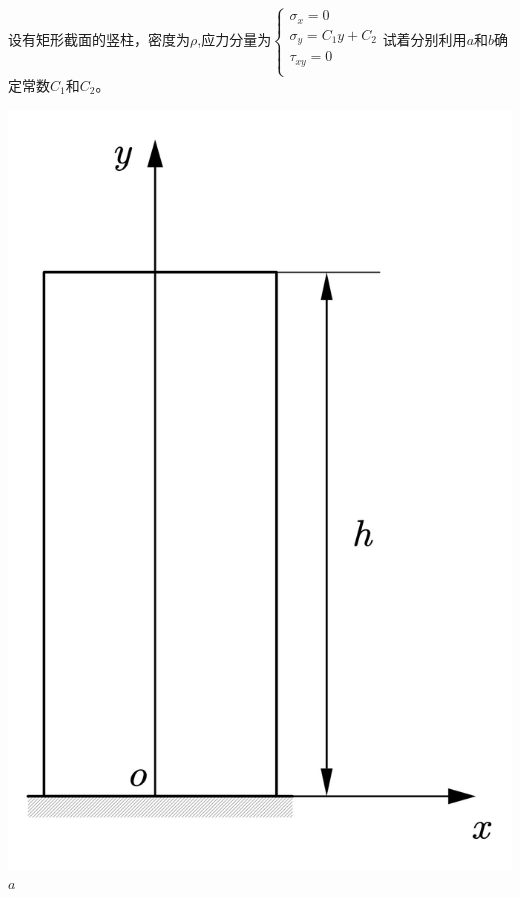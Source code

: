 \begin{example}
设有矩形截面的竖柱，密度为$\rho$,应力分量为$\begin{cases}
\sigma _x=0\\
\sigma _y=C_1y+C_2\\
\tau _{xy}=0\\
\end{cases}$试着分别利用$a$和$b$确定常数$C_1$和$C_2$。
\end{example}
\begin{center}
	\begin{minipage}[c]{0.3\textwidth}
		\centering
		\includegraphics[scale=0.3]{figure/2-5.png}\\
		$a$\\
		\begin{flushleft}

\end{flushleft}
\end{minipage}
\end{center}
